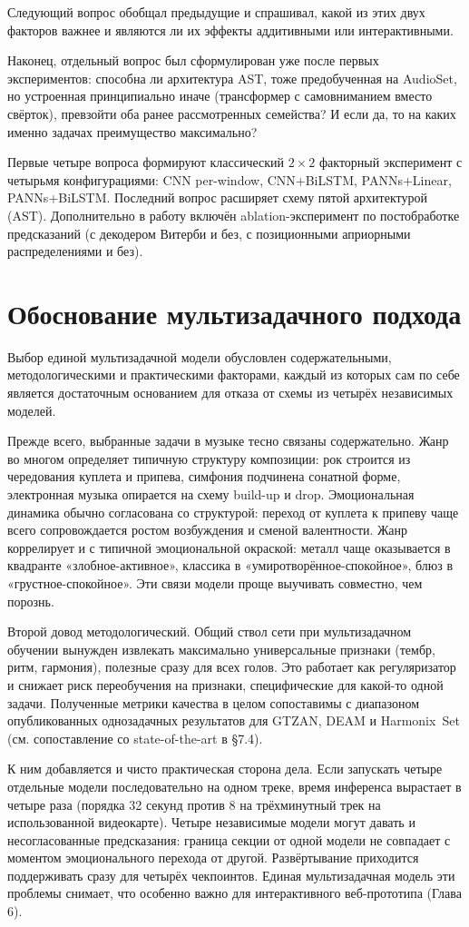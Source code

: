 Следующий вопрос обобщал предыдущие и спрашивал, какой из этих двух факторов важнее и являются ли их эффекты аддитивными или интерактивными.

Наконец, отдельный вопрос был сформулирован уже после первых экспериментов: способна ли архитектура AST, тоже предобученная на AudioSet, но устроенная принципиально иначе (трансформер с самовниманием вместо свёрток), превзойти оба ранее рассмотренных семейства? И если да, то на каких именно задачах преимущество максимально?

Первые четыре вопроса формируют классический $2 \times 2$ факторный эксперимент с четырьмя конфигурациями: CNN per-window, CNN+BiLSTM, PANNs+Linear, PANNs+BiLSTM. Последний вопрос расширяет схему пятой архитектурой (AST). Дополнительно в работу включён ablation-эксперимент по постобработке предсказаний (с декодером Витерби и без, с позиционными априорными распределениями и без).

\section{Обоснование мультизадачного подхода}\label{sec:2-3}

Выбор единой мультизадачной модели обусловлен содержательными, методологическими и практическими факторами, каждый из которых сам по себе является достаточным основанием для отказа от схемы из четырёх независимых моделей.

Прежде всего, выбранные задачи в музыке тесно связаны содержательно. Жанр во многом определяет типичную структуру композиции: рок строится из чередования куплета и припева, симфония подчинена сонатной форме, электронная музыка опирается на схему build-up и drop. Эмоциональная динамика обычно согласована со структурой: переход от куплета к припеву чаще всего сопровождается ростом возбуждения и сменой валентности. Жанр коррелирует и с типичной эмоциональной окраской: металл чаще оказывается в квадранте «злобное-активное», классика в «умиротворённое-спокойное», блюз в «грустное-спокойное». Эти связи модели проще выучивать совместно, чем порознь.

Второй довод методологический. Общий ствол сети при мультизадачном обучении вынужден извлекать максимально универсальные признаки (тембр, ритм, гармония), полезные сразу для всех голов. Это работает как регуляризатор и снижает риск переобучения на признаки, специфические для какой-то одной задачи. Полученные метрики качества в целом сопоставимы с диапазоном опубликованных однозадачных результатов для GTZAN, DEAM и Harmonix~Set (см. сопоставление со state-of-the-art в §7.4).

К ним добавляется и чисто практическая сторона дела. Если запускать четыре отдельные модели последовательно на одном треке, время инференса вырастает в четыре раза (порядка 32 секунд против 8 на трёхминутный трек на использованной видеокарте). Четыре независимые модели могут давать и несогласованные предсказания: граница секции от одной модели не совпадает с моментом эмоционального перехода от другой. Развёртывание приходится поддерживать сразу для четырёх чекпоинтов. Единая мультизадачная модель эти проблемы снимает, что особенно важно для интерактивного веб-прототипа (Глава 6).
